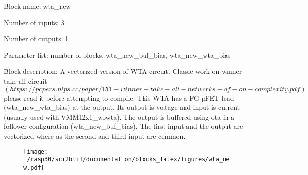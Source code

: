 \pagebreak
Block name: wta\_new

Number of inputs: 3

Number of outputs: 1

Parameter list: number of blocks, wta\_new\_buf\_bias, wta\_new\_wta\_bias

Block description: 
A vectorized version of WTA circuit. Classic work on winner take all circuit $(https://papers.nips.cc/paper/151-winner-take-all-networks-of-on-complexity.pdf)$ please read it before attempting to compile. 
This WTA has a FG pFET load (wta\_new\_wta\_bias) at the output. Its output is voltage and input is current (usually used with VMM12x1\_wowta).
The output is buffered using ota in a follower configuration (wta\_new\_buf\_bias). The first input and the output are vectorized where as the second and third input are common.



\begin{figure}[H]  %
\texttt{[image: ~/rasp30/sci2blif/documentation/blocks\_latex/figures/wta\_new.pdf]}
\end{figure}

